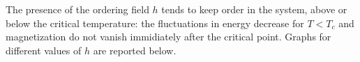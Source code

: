 \documentclass{beamer}
\begin{document}
\begin{frame}

The presence of the ordering field $h$ tends to keep order in the system, above or
below the critical temperature: the fluctuations in energy decrease for $T < T_c$
and magnetization do not vanish immidiately after the critical point. Graphs for
different values of $h$ are reported below.

\vspace{5mm}

\begin{columns}



\end{columns}
\end{frame}
\end{document}
